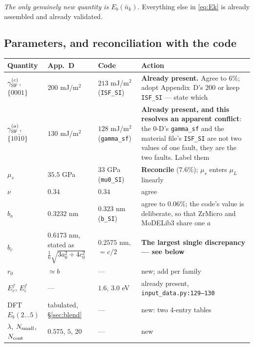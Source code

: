 \documentclass[11pt]{article}
\newcommand{\ZrM}{\textsf{ZrMicro}}
\newcommand{\MoD}{\textsf{MoDELib3}}
\newcommand{\fbk}{\discretionary{}{}{}}   %
\newcommand{\file}[1]{\texttt{\small #1}}
\newcommand{\GSF}{\gamma_{\rm SF}}
\begin{document}
\emph{The only genuinely new quantity is $E_b(\bar n_k)$.}  Everything else in
\eqref{eq:Ek} is already assembled and already validated.

\subsection{Parameters, and reconciliation with the code}
\label{sec:reconcile}

{\small
\begin{longtable}{@{}p{}p{}p{}p{}@{}}
\toprule
\textbf{Quantity} & \textbf{App.~D} & \textbf{Code} & \textbf{Action}\\
\midrule
\endhead
$\GSF^{(c)}$, $\{0001\}$ & $200$ mJ/m$^2$ & $213$ mJ/m$^2$
  (\verb|ISF_SI|) & \textbf{Already present.}  Agree to $6\%$; adopt
  Appendix~D's $200$ or keep \verb|ISF_SI| --- state which\\
\addlinespace
$\GSF^{(a)}$, $\{10\bar10\}$ & $130$ mJ/m$^2$ & $128$ mJ/m$^2$
  (\verb|gamma_sf|) & \textbf{Already present, and this resolves an apparent
  conflict}: the 0-D's \verb|gamma_sf| and the material file's \verb|ISF_SI|
  are not two values of one fault, they are the two faults.  Label them\\
\addlinespace
$\mu_s$ & $35.5$ GPa & $33$ GPa
  (\verb|mu0_SI|) & \textbf{Reconcile} ($7.6\%$); $\mu_s$ enters $\mu_L$
  linearly\\
\addlinespace
$\nu$ & $0.34$ & $0.34$ & agree\\
\addlinespace
$b_a$ & $0.3232$ nm & $0.323$ nm
  (\verb|b_SI|) & agree to $0.06\%$; the code's value is deliberate, so that
  \ZrM{} and \MoD{} share one $a$\\
\addlinespace
$b_c$ & $0.6173$ nm, stated as
  $\tfrac16\sqrt{3a_0^2+4c_0^2}$ & $0.2575$ nm, $=c/2$ &
  \textbf{The largest single discrepancy --- see below}\\
\addlinespace
$r_0$ & $\simeq b$ & --- & new; add per family\\
\addlinespace
$E_v^{f}$, $E_i^{f}$ & --- & $1.6$, $3.0$ eV &
  already present, \file{input\_\fbk data.\fbk py:129--130}\\
\addlinespace
DFT $E_b(2\ldots5)$ & tabulated, \S\ref{sec:blend} & --- & new: two 4-entry
  tables\\
\addlinespace
$\lambda$, $N_{\rm small}$, $N_{\rm cont}$ & $0.575$, $5$, $20$ & --- & new\\
\bottomrule
\end{longtable}
}
\end{document}

